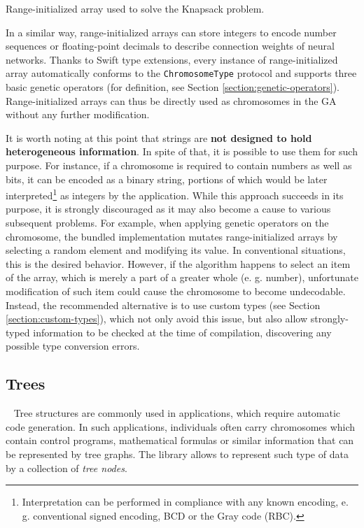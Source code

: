 \begin{listing}[ht]
	\caption{Range-initialized array used to solve the Knapsack problem.}
	\label{listing:array-knapsack}
\end{listing}

In a similar way, range-initialized arrays can store integers to encode number sequences or floating-point decimals to describe connection weights of neural networks. Thanks to Swift type extensions, every instance of range-initialized array automatically conforms to the \texttt{ChromosomeType} protocol and supports three basic genetic operators (for definition, see Section \ref{section:genetic-operators}). Range-initialized arrays can thus be directly used as chromosomes in the GA without any further modification.

It is worth noting at this point that strings are \textbf{not designed to hold heterogeneous information}. In spite of that, it is possible to use them for such purpose. For instance, if a chromosome is required to contain numbers as well as bits, it can be encoded as a binary string, portions of which would be later interpreted\footnote{Interpretation can be performed in compliance with any known encoding, e. g. conventional signed encoding, BCD or the Gray code (RBC).} as integers by the application. While this approach succeeds in its purpose, it is strongly discouraged as it may also become a cause to various subsequent problems. For example, when applying genetic operators on the chromosome, the bundled implementation mutates range-initialized arrays by selecting a random element and modifying its value. In conventional situations, this is the desired behavior. However, if the algorithm happens to select an item of the array, which is merely a part of a greater whole (e. g. number), unfortunate modification of such item could cause the chromosome to become undecodable. Instead, the recommended alternative is to use custom types (see Section \ref{section:custom-types}), which not only avoid this issue, but also allow strongly-typed information to be checked at the time of compilation, discovering any possible type conversion errors.

\subsection{Trees}~\label{section:trees}
Tree structures are commonly used in applications, which require automatic code generation. In such applications, individuals often carry chromosomes which contain control programs, mathematical formulas or similar information that can be represented by tree graphs. The library allows to represent such type of data by a collection of \textit{tree nodes}.

